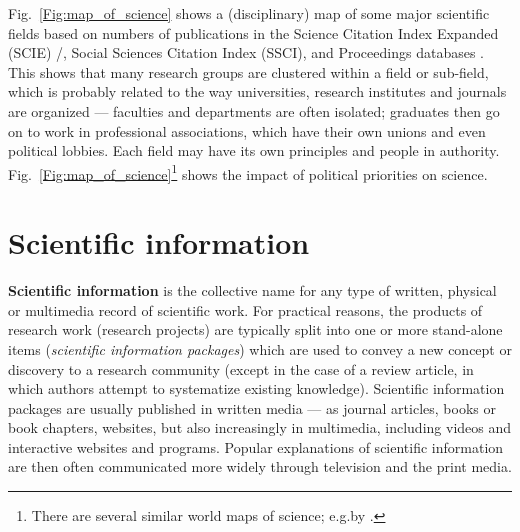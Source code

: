 \documentclass[graybox,envcountchap,sectrefs,UStrade]{svmono}
\begin{document}
\begin{center}
\end{center}

Fig.\@~\ref{Fig:map_of_science} shows a (disciplinary) map of some major scientific fields based on numbers of publications in the Science Citation Index Expanded (SCIE) /, Social Sciences Citation Index (SSCI), and Proceedings databases \citep{Boyack2009Scientometrics}. This shows that many research groups are clustered within a field or sub-field, which is probably related to the way universities, research institutes and journals are organized --- faculties and departments are often isolated; graduates then go on to work in professional associations, which have their own unions and even political lobbies. Each field may have its own principles and people in authority. Fig.\@~\ref{Fig:map_of_science}\footnote{There are several similar world maps of science; e.g.\@ by \citet{Bollen2009PLOS}.} shows the impact of political priorities on science.\par


\section{Scientific information}


\textbf{Scientific information} is the collective name for any type of written, physical or multimedia record of scientific work. For practical reasons, the products of research work (research projects) are typically split into one or more stand-alone items (\emph{scientific information packages}) which are used to convey a new concept or discovery to a research community (except in the case of a review article, in which authors attempt to systematize existing knowledge). Scientific information packages are usually published in written media --- as journal articles, books or book chapters, websites, but also increasingly in multimedia, including videos and interactive websites and programs. Popular explanations of scientific information are then often communicated more widely through television and the print media. \par
\end{document}
